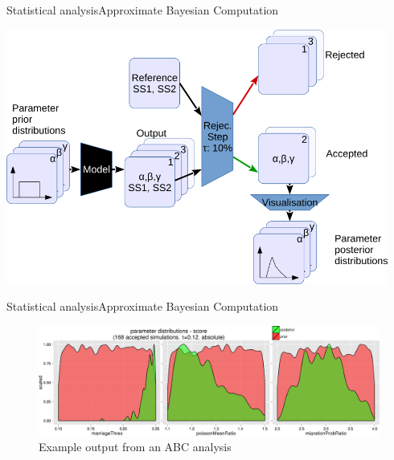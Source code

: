 \documentclass[10pt, aspectratio=43]{beamer}
\begin{document}
\begin{frame}{Statistical analysis}{Approximate Bayesian Computation}
\begin{center}
  \includegraphics[width=0.94\textwidth]{../data/abc-landscape.png}
\end{center}
\end{frame}

\begin{frame}{Statistical analysis}{Approximate Bayesian Computation}
\begin{center}
  \begin{figure}
    \hspace*{-0.85cm}
    \includegraphics[width=1.15\textwidth]{../data/abc-priors-posteriors.png}
    \caption{Example output from an ABC analysis}
  \end{figure}
\end{center}
\end{frame}
\end{document}
